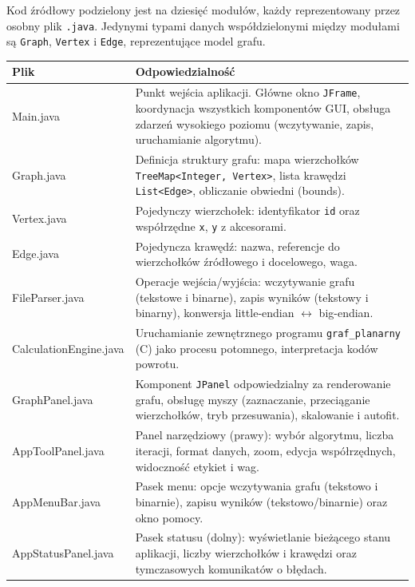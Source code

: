 \documentclass[a4paper, 11pt]{article}
\begin{document}
Kod źródłowy podzielony jest na dziesi\k{e}\'c modu\l{}\'ow, ka\.zdy reprezentowany
przez osobny plik \texttt{.java}. Jedynymi typami danych współdzielonymi
między modułami są \texttt{Graph}, \texttt{Vertex} i \texttt{Edge},
reprezentujące model grafu.

\begin{center}
\begin{tabular}{>{\ttfamily}l p{9.2cm}}
\toprule
\normalfont\textbf{Plik} & \textbf{Odpowiedzialno\'s\'c} \\
\midrule
Main.java            & Punkt wejścia aplikacji. Główne okno \texttt{JFrame}, koordynacja wszystkich komponentów GUI, obsługa zdarzeń wysokiego poziomu (wczytywanie, zapis, uruchamianie algorytmu). \\
\addlinespace
Graph.java           & Definicja struktury grafu: mapa wierzchołków \texttt{TreeMap<Integer, Vertex>}, lista krawędzi \texttt{List<Edge>}, obliczanie obwiedni (bounds). \\
\addlinespace
Vertex.java          & Pojedynczy wierzchołek: identyfikator \texttt{id} oraz współrzędne \texttt{x}, \texttt{y} z akcesorami. \\
\addlinespace
Edge.java            & Pojedyncza krawędź: nazwa, referencje do wierzchołków źródłowego i docelowego, waga. \\
\addlinespace
FileParser.java      & Operacje wejścia/wyjścia: wczytywanie grafu (tekstowe i binarne), zapis wyników (tekstowy i binarny), konwersja little-endian $\leftrightarrow$ big-endian. \\
\addlinespace
CalculationEngine.java & Uruchamianie zewnętrznego programu \texttt{graf\_planarny} (C) jako procesu potomnego, interpretacja kodów powrotu. \\
\addlinespace
GraphPanel.java      & Komponent \texttt{JPanel} odpowiedzialny za renderowanie grafu, obsługę myszy (zaznaczanie, przeciąganie wierzchołków, tryb przesuwania), skalowanie i autofit. \\
\addlinespace
AppToolPanel.java    & Panel narzędziowy (prawy): wybór algorytmu, liczba iteracji, format danych, zoom, edycja współrzędnych, widoczność etykiet i wag. \\
\addlinespace
AppMenuBar.java      & Pasek menu: opcje wczytywania grafu (tekstowo i binarnie), zapisu wyników (tekstowo/binarnie) oraz okno pomocy. \\
\addlinespace
AppStatusPanel.java  & Pasek statusu (dolny): wyświetlanie bieżącego stanu aplikacji, liczby wierzchołków i krawędzi oraz tymczasowych komunikatów o błędach. \\
\bottomrule
\end{tabular}
\end{center}
\end{document}
